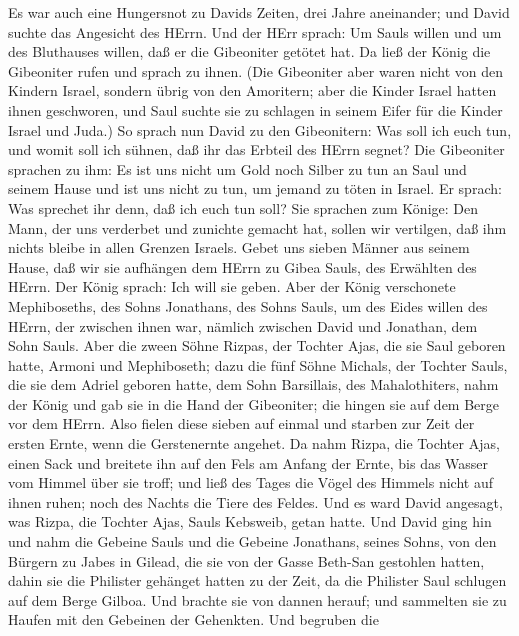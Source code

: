  Es war auch eine Hungersnot zu Davids Zeiten, drei Jahre
aneinander; und David suchte das Angesicht des HErrn. Und der HErr
sprach: Um Sauls willen und um des Bluthauses willen, daß er die
Gibeoniter getötet hat.  Da ließ der König die Gibeoniter
rufen und sprach zu ihnen. (Die Gibeoniter aber waren nicht von den
Kindern Israel, sondern übrig von den Amoritern; aber die Kinder Israel
hatten ihnen geschworen, und Saul suchte sie zu schlagen in seinem Eifer
für die Kinder Israel und Juda.)  So sprach nun David zu den
Gibeonitern: Was soll ich euch tun, und womit soll ich sühnen, daß ihr
das Erbteil des HErrn segnet?  Die Gibeoniter sprachen zu
ihm: Es ist uns nicht um Gold noch Silber zu tun an Saul und seinem
Hause und ist uns nicht zu tun, um jemand zu töten in Israel. Er sprach:
Was sprechet ihr denn, daß ich euch tun soll?  Sie sprachen
zum Könige: Den Mann, der uns verderbet und zunichte gemacht hat, sollen
wir vertilgen, daß ihm nichts bleibe in allen Grenzen Israels.
 Gebet uns sieben Männer aus seinem Hause, daß wir sie
aufhängen dem HErrn zu Gibea Sauls, des Erwählten des HErrn. Der König
sprach: Ich will sie geben.  Aber der König verschonete
Mephiboseths, des Sohns Jonathans, des Sohns Sauls, um des Eides willen
des HErrn, der zwischen ihnen war, nämlich zwischen David und Jonathan,
dem Sohn Sauls.  Aber die zween Söhne Rizpas, der Tochter
Ajas, die sie Saul geboren hatte, Armoni und Mephiboseth; dazu die fünf
Söhne Michals, der Tochter Sauls, die sie dem Adriel geboren hatte, dem
Sohn Barsillais, des Mahalothiters, nahm der König  und gab
sie in die Hand der Gibeoniter; die hingen sie auf dem Berge vor dem
HErrn. Also fielen diese sieben auf einmal und starben zur Zeit der
ersten Ernte, wenn die Gerstenernte angehet.  Da nahm
Rizpa, die Tochter Ajas, einen Sack und breitete ihn auf den Fels am
Anfang der Ernte, bis das Wasser vom Himmel über sie troff; und ließ des
Tages die Vögel des Himmels nicht auf ihnen ruhen; noch des Nachts die
Tiere des Feldes.  Und es ward David angesagt, was Rizpa,
die Tochter Ajas, Sauls Kebsweib, getan hatte.  Und David
ging hin und nahm die Gebeine Sauls und die Gebeine Jonathans, seines
Sohns, von den Bürgern zu Jabes in Gilead, die sie von der Gasse
Beth-San gestohlen hatten, dahin sie die Philister gehänget hatten zu
der Zeit, da die Philister Saul schlugen auf dem Berge Gilboa.
 Und brachte sie von dannen herauf; und sammelten sie zu
Haufen mit den Gebeinen der Gehenkten.  Und begruben die
